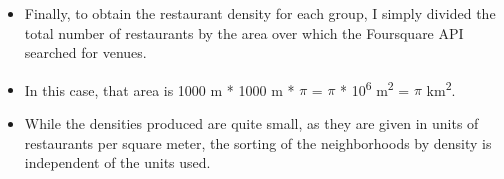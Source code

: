 \documentclass[aspectratio=169]{beamer}
\begin{document}
 \begin{frame}
 \begin{itemize}
  \item Finally, to obtain the restaurant density for each group, I simply divided the total number of restaurants by the area over which the Foursquare API searched for venues.
  \item In this case, that area is 1000 m * 1000 m * $\pi$ = $\pi$ * 10\textsuperscript{6} m\textsuperscript{2} = $\pi$ km\textsuperscript{2}.
  \item While the densities produced are quite small, as they are given in units of restaurants per square meter, the sorting of the neighborhoods by density is independent of the units used.
 \end{itemize}

\end{frame}
\end{document}
